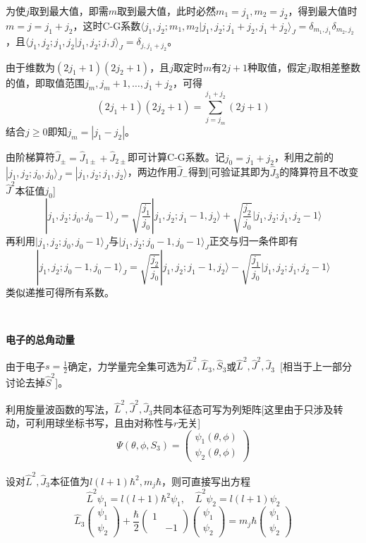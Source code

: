 \documentclass[a4paper,UTF8,fontset=windows]{ctexart}
\newcommand*{\ket}[1]{|#1\rangle}
\newcommand*{\bk}[2]{\langle#1|#2\rangle}
\begin{document}
为使$j$取到最大值，即需$m$取到最大值，此时必然$m_1=j_1,m_2=j_2$，得到最大值时$m=j=j_1+j_2$，这时C-G系数$\bk{j_1,j_2;m_1,m_2}{j_1,j_2;j_1+j_2,j_1+j_2}_J=\delta_{m_1,j_1}\delta_{m_2,j_2}$，且$\bk{j_1,j_2;j_1,j_2}{j_1,j_2;j,j}_J=\delta_{j,j_1+j_2}$。

由于维数为$(2j_1+1)(2j_2+1)$，且$j$取定时$m$有$2j+1$种取值，假定$j$取相差整数的值，即取值范围$j_m,j_m+1,\dots,j_1+j_2$，可得
$$(2j_1+1)(2j_2+1)=\sum_{j=j_m}^{j_1+j_2}(2j+1)$$
结合$j\ge0$即知$j_m=|j_1-j_2|$。

由阶梯算符$\hat{J}_\pm=\hat{J}_{1\pm}+\hat{J}_{2\pm}$即可计算C-G系数。记$j_0=j_1+j_2$，利用之前的$\ket{j_1,j_2;j_0,j_0}_J=\ket{j_1,j_2;j_1,j_2}$，两边作用$\hat{J}_-$得到[可验证其即为$\hat{J}_3$的降算符且不改变$\hat{J}^2$本征值$j_0$]
$$\ket{j_1,j_2;j_0,j_0-1}_J=\sqrt{\frac{j_1}{j_0}}\ket{j_1,j_2;j_1-1,j_2}+\sqrt{\frac{j_2}{j_0}}\ket{j_1,j_2;j_1,j_2-1}$$
再利用$\ket{j_1,j_2;j_0,j_0-1}_J$与$\ket{j_1,j_2;j_0-1,j_0-1}_J$正交与归一条件即有
$$\ket{j_1,j_2;j_0-1,j_0-1}_J=\sqrt{\frac{j_2}{j_0}}\ket{j_1,j_2;j_1-1,j_2}-\sqrt{\frac{j_1}{j_0}}\ket{j_1,j_2;j_1,j_2-1}$$
类似递推可得所有系数。

\

\textbf{电子的总角动量}

由于电子$s=\frac{1}{2}$确定，力学量完全集可选为$\hat{L}^2,\hat{L}_3,\hat{S}_3$或$\hat{L}^2,\hat{J}^2,\hat{J}_3$\ [相当于上一部分讨论去掉$\hat{S}^2$]。

利用旋量波函数的写法，$\hat{L}^2,\hat{J}^2,\hat{J}_3$共同本征态可写为列矩阵[这里由于只涉及转动，可利用球坐标书写，且由对称性与$r$无关]
$$\Psi(\theta,\phi,S_3)=\begin{pmatrix}\psi_1(\theta,\phi)\\\psi_2(\theta,\phi)\end{pmatrix}$$

设对$\hat{L}^2,\hat{J}_3$本征值为$l(l+1)\hbar^2,m_j\hbar$，则可直接写出方程
$$\hat{L}^2\psi_1=l(l+1)\hbar^2\psi_1,\quad\hat{L}^2\psi_2=l(l+1)\psi_2$$
$$\hat{L}_3\begin{pmatrix}\psi_1\\\psi_2\end{pmatrix}+\frac{\hbar}{2}\begin{pmatrix}1&\\ &-1\end{pmatrix}\begin{pmatrix}\psi_1\\\psi_2\end{pmatrix}=m_j\hbar\begin{pmatrix}\psi_1\\\psi_2\end{pmatrix}$$
\end{document}
